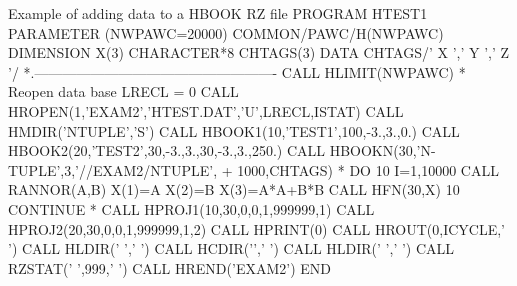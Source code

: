 \begin{XMPt}{Example of adding data to a HBOOK RZ file}
      PROGRAM HTEST1
      PARAMETER (NWPAWC=20000)
      COMMON/PAWC/H(NWPAWC)
      DIMENSION X(3)
      CHARACTER*8 CHTAGS(3)
      DATA CHTAGS/'   X   ','   Y   ','   Z   '/
*.----------------------------------------------------
      CALL HLIMIT(NWPAWC)
*             Reopen data base
      LRECL = 0
      CALL HROPEN(1,'EXAM2','HTEST.DAT','U',LRECL,ISTAT)
      CALL HMDIR('NTUPLE','S')
      CALL HBOOK1(10,'TEST1',100,-3.,3.,0.)
      CALL HBOOK2(20,'TEST2',30,-3.,3.,30,-3.,3.,250.)
      CALL HBOOKN(30,'N-TUPLE',3,'//EXAM2/NTUPLE',
     +            1000,CHTAGS)
*
      DO 10 I=1,10000
         CALL RANNOR(A,B)
         X(1)=A
         X(2)=B
         X(3)=A*A+B*B
         CALL HFN(30,X)
  10  CONTINUE
*
      CALL HPROJ1(10,30,0,0,1,999999,1)
      CALL HPROJ2(20,30,0,0,1,999999,1,2)
      CALL HPRINT(0)
      CALL HROUT(0,ICYCLE,' ')
      CALL HLDIR(' ',' ')
      CALL HCDIR('\bs',' ')
      CALL HLDIR(' ',' ')
      CALL RZSTAT(' ',999,' ')
      CALL HREND('EXAM2')
      END
\end{XMPt}

